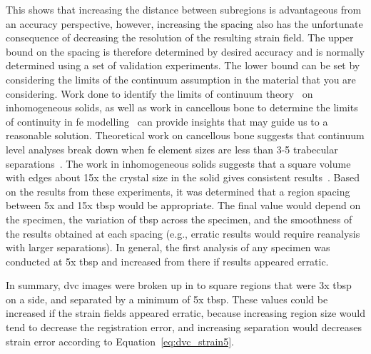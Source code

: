 This shows that increasing the distance between subregions is advantageous from an accuracy perspective, however, increasing the spacing also has the unfortunate consequence of decreasing the resolution of the resulting strain field.
The upper bound on the spacing is therefore determined by desired accuracy and is normally determined using a set of validation experiments.
The lower bound can be set by considering the limits of the continuum assumption in the material that you are considering.
Work done to identify the limits of continuum theory~\citep{liu_minimum_2005} on inhomogeneous solids, as well as work in cancellous bone to determine the limits of continuity in \ac{fe} modelling~\citep{harrigan_limitations_1988} can provide insights that may guide us to a reasonable solution.
Theoretical work on cancellous bone suggests that continuum level analyses break down when \ac{fe} element sizes are less than 3-5 trabecular separations~\citep{harrigan_limitations_1988}.
The work in inhomogeneous solids suggests that a square volume with edges about 15x the crystal size in the solid gives consistent results~\citep{liu_minimum_2005}.
Based on the results from these experiments, it was determined that a region spacing between 5x and 15x \ac{tbsp} would be appropriate.
The final value would depend on the specimen, the variation of \ac{tbsp} across the specimen, and the smoothness of the results obtained at each spacing (e.g., erratic results would require reanalysis with larger separations).
In general, the first analysis of any specimen was conducted at 5x \ac{tbsp} and increased from there if results appeared erratic.

In summary, \ac{dvc} images were broken up in to square regions that were 3x \ac{tbsp} on a side, and separated by a minimum of 5x \ac{tbsp}.
These values could be increased if the strain fields appeared erratic, because increasing region size would tend to decrease the registration error, and increasing separation would decreases strain error according to Equation~\ref{eq:dvc_strain5}.

